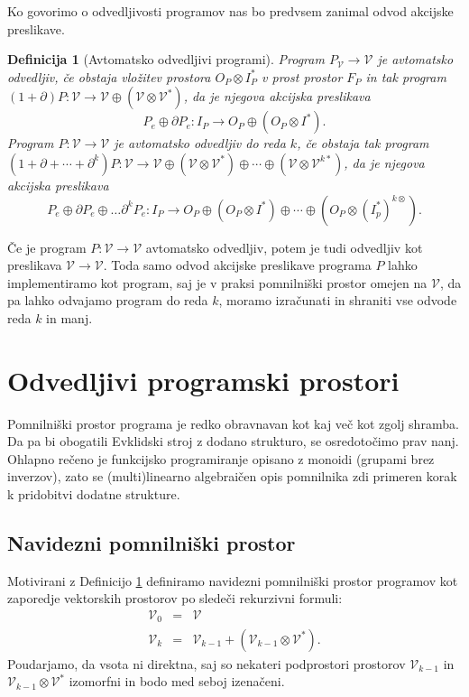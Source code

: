 \documentclass[a4paper, 12pt]{book}
\newcommand{\VV}{\mathcal{V}}
\newcommand{\D}{\partial}
\newtheorem{definicija}{Definicija}[chapter]
\begin{document}
Ko govorimo o odvedljivosti programov nas bo predvsem zanimal odvod akcijske preslikave.
\begin{definicija}[Avtomatsko odvedljivi programi]\label{def:autDef}
Program $P_\VV\to\VV$ je \emph{avtomatsko odvedljiv}, če obstaja vložitev prostora $O_P\otimes I_P^*$ v prost prostor $F_P$ in tak program $(1+\D )P:\VV\to \VV\oplus(\VV\otimes\VV^*)$, da je njegova akcijska preslikava
\begin{equation}
    \label{eq:program_derivative}
    P_e\oplus \D P_e:I_P\rightarrow O_P\oplus (O_P\otimes I^*).
  \end{equation}
Program $P:\VV\to\VV$ je \emph{avtomatsko odvedljiv do reda} $k$, če obstaja tak program $(1+\D+\cdots+\D^k)P:\VV\to \VV\oplus(\VV\otimes\VV^*)\oplus\cdots\oplus(\VV\otimes\VV^{k*})$, da je njegova akcijska preslikava
\begin{equation}
    \label{eq:program_derivative_higher}
    P_e\oplus \D P_e\oplus \ldots \D^k P_e:I_P\rightarrow O_P\oplus \left(O_P\otimes I^*\right)\oplus\cdots\oplus \left( O_P\otimes \left( I_p^*\right)^{k\otimes} \right).
  \end{equation}
\end{definicija}

Če je program $P:\VV\to\VV$ avtomatsko odvedljiv, potem je tudi odvedljiv kot preslikava $\VV\to\VV$. Toda samo odvod akcijske preslikave programa $P$ lahko implementiramo kot program, saj je v praksi pomnilniški prostor omejen na $\VV$, da pa lahko odvajamo program do reda $k$, moramo izračunati in shraniti vse odvode reda $k$ in manj.

\chapter{Odvedljivi programski prostori} \label{ch:OdvProgPros}

Pomnilniški prostor programa je redko obravnavan kot kaj več kot zgolj shramba. Da pa bi obogatili Evklidski stroj z dodano strukturo, se osredotočimo prav nanj. Ohlapno rečeno je funkcijsko programiranje opisano z monoidi (grupami brez inverzov), zato se (multi)linearno algebraičen opis pomnilnika zdi primeren korak k pridobitvi dodatne strukture.

\section{Navidezni pomnilniški prostor}

Motivirani z Definicijo \ref{def:autDef} definiramo navidezni pomnilniški prostor programov kot zaporedje vektorskih prostorov po sledeči rekurzivni formuli:
\begin{eqnarray}
  \VV_0 &=& \VV\\
  \label{eq:universal_space}
  \VV_k &=& \VV_{k-1}+\left(\VV_{k-1}\otimes \VV^*\right).
\end{eqnarray}
Poudarjamo, da vsota ni direktna, saj so nekateri podprostori prostorov $\VV_{k-1}$ in $\VV_{k-1}\otimes\VV^*$ izomorfni in bodo med seboj izenačeni.
\end{document}

